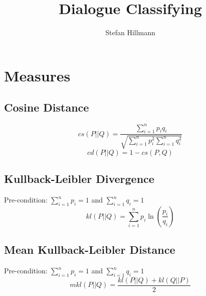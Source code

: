 \documentclass[10pt,a4paper]{article}
\author{Stefan Hillmann}
\title{Dialogue Classifying}
\begin{document}
\maketitle

\section{Measures}
\subsection{Cosine Distance}
\begin{equation}
  cs(P||Q)=\frac{ \sum\limits_{i=1}^n p_i q_i }{ \sqrt{ \sum\limits_{i=1}^n p_i^2 \sum\limits_{i=1}^n q_i^2 } }
\end{equation}
\begin{equation}
  cd(P||Q) = 1-cs(P,Q)
\end{equation}

\subsection{Kullback-Leibler Divergence}
Pre-condition: $\sum\limits_{i=1}^n p_i = 1$ and $\sum\limits_{i=1}^n q_i = 1$
\begin{equation}
  kl(P||Q) = \sum\limits_{i=1}^n p_i \ln\left(\frac{p_i}{q_i}\right)
  \label{eq:kbl}
\end{equation}

\subsection{Mean Kullback-Leibler Distance}
Pre-condition: $\sum\limits_{i=1}^n p_i = 1$ and $\sum\limits_{i=1}^n q_i = 1$
\begin{equation}
  mkl(P||Q) = \frac{kl(P||Q)+kl(Q||P)}{2}
  \label{eq:m_kbl}
\end{equation}
\end{document}
